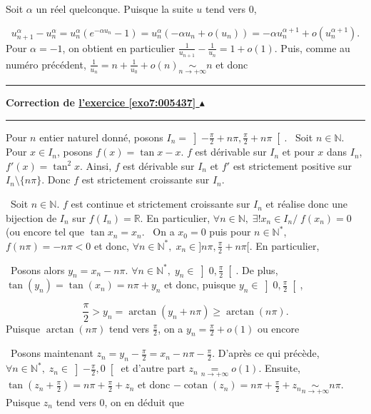 \documentclass[11pt,a4paper]{article}
\newcommand{\Nn}{\mathbb{N}} \newcommand{\N}{\mathbb{N}}
\newcommand{\Rr}{\mathbb{R}} \newcommand{\R}{\mathbb{R}}
\newcommand{\cotan}{\mathop{\mathrm{cotan}}\nolimits}
\newcommand{\Arctan}{\mathop{\mathrm{arctan}}\nolimits}
\newcounter{exo}
\newcommand{\correction}[1]{\hypertarget{cor7:#1}{}\label{cor7:#1}{\bf Correction de \hyperlink{exo7:#1}{l'exercice \ref{exo7:#1} $\blacktriangle$}}\vspace{1mm}\hrule\vspace{1mm}}
\newcommand{\fincorrection}{\vspace{1mm}\hrule\vspace*{7mm}}
\begin{document}
\begin{center}
\end{center}
Soit $\alpha$ un réel quelconque. Puisque la suite $u$ tend vers $0$,

$$u_{n+1}^{\alpha}-u_n^{\alpha}=u_n^{\alpha}(e^{-\alpha u_n}-1)=u_n^{\alpha}(-\alpha u_n+o(u_n))=-\alpha u_n^{\alpha+1}+o(u_n^{\alpha+1}).$$
Pour $\alpha=-1$, on obtient en particulier $\frac{1}{u_{n+1}}-\frac{1}{u_n}=1+o(1)$. Puis, comme au numéro précédent, $\frac{1}{u_n}=n+\frac{1}{u_0}+o(n)\underset{n\rightarrow+\infty}{\sim}n$ et donc 

\begin{center}
\end{center}
\fincorrection
\correction{005437}
Pour $n$ entier naturel donné, posons $I_n=\left]-\frac{\pi}{2}+n\pi,\frac{\pi}{2}+n\pi\right[$.
\textbullet~Soit $n\in\Nn$. Pour $x\in I_n$, posons $f(x)=\tan x-x$. $f$ est dérivable sur $I_n$ et pour $x$ dans $I_n$, $f'(x)=\tan^2x$. Ainsi, $f$ est dérivable sur $I_n$ et $f'$ est strictement positive sur $I_n\setminus\{n\pi\}$. Donc $f$ est strictement croissante sur $I_n$.

\textbullet~Soit $n\in\Nn$. $f$ est continue et strictement croissante sur $I_n$ et réalise donc une bijection de $I_n$ sur $f(I_n)=\Rr$. En particulier, $\forall n\in\Nn,\;\exists!x_n\in I_n/\;f(x_n)=0$ (ou encore tel que $\tan x_n=x_n$.
\textbullet~On a $x_0=0$ puis pour $n\in\Nn^*$, $f(n\pi)=-n\pi<0$ et donc, $\forall n\in\Nn^*,\;x_n\in]n\pi,\frac{\pi}{2}+n\pi[$. En particulier,

\begin{center}
\end{center}
\textbullet~Posons alors $y_n=x_n-n\pi$. $\forall n\in\Nn^*,\;y_n\in\left]0,\frac{\pi}{2}\right[$. De plus, $\tan(y_n)=\tan(x_n)=n\pi+y_n$ et donc, puisque $y_n\in\left]0,\frac{\pi}{2}\right[$,

$$\frac{\pi}{2}>y_n=\Arctan(y_n+n\pi)\geq\Arctan(n\pi).$$ 
Puisque $\Arctan(n\pi)$ tend vers $\frac{\pi}{2}$, on a $y_n=\frac{\pi}{2}+o(1)$ ou encore

\begin{center}
\end{center}
\textbullet~Posons maintenant $z_n=y_n-\frac{\pi}{2}=x_n-n\pi-\frac{\pi}{2}$.
D'après ce qui précède, $\forall n\in\Nn^*,\;z_n\in\left]-\frac{\pi}{2},0\right[$ et d'autre part $z_n\underset{n\rightarrow+\infty}{=}o(1)$.
Ensuite, $\tan\left(z_n+\frac{\pi}{2}\right)=n\pi+\frac{\pi}{2}+z_n$ et donc $-\cotan(z_n)=n\pi+\frac{\pi}{2}+z_n\underset{n\rightarrow+\infty}{\sim}n\pi$. Puisque $z_n$ tend vers $0$, on en déduit que
\end{document}
